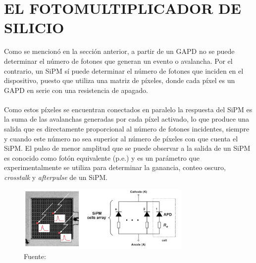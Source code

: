 \section{EL FOTOMULTIPLICADOR DE SILICIO}
Como se mencionó en la sección anterior, a partir de un GAPD no se puede determinar el número de fotones que generan un evento o avalancha. Por el contrario, un SiPM sí puede determinar el número de fotones que inciden en el dispositivo, puesto que utiliza una matriz de píxeles, donde cada píxel es un  GAPD en serie con una resistencia de apagado. \\ \\
Como estos píxeles se encuentran conectados en paralelo la respuesta del SiPM es la suma de las avalanchas generadas por cada píxel activado, lo que produce una salida que es directamente proporcional al número de fotones incidentes, siempre y cuando este número no sea superior al número de píxeles con que cuenta el SiPM. El pulso de menor amplitud que se puede observar a la salida de un SiPM es conocido como fotón equivalente (p.e.) y es un parámetro que experimentalmente se utiliza para determinar la ganancia, conteo oscuro, \textit{crosstalk} y \textit{afterpulse} de un SiPM.
\begin{figure}[h!]
\begin{centering}
    \caption{Estructura de un SiPM, compuesto por microceldas de GAPDs conectadas en paralelo. Adaptado de \footcite{Muon_counting_Amiga}.}
    \includegraphics[width=0.75\textwidth]{Images/APD_array.PNG}
    \caption*{Fuente:}
    \label{fig:APD_array}  
  \par\end{centering}
\end{figure}
